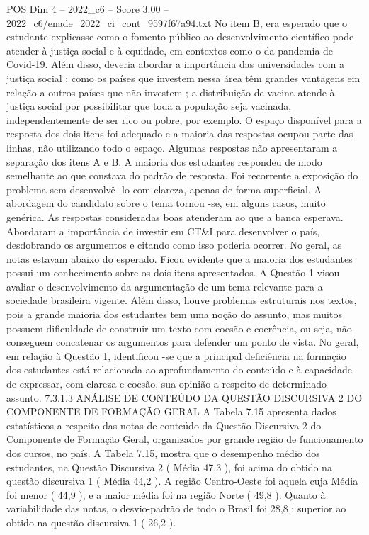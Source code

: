 \begin{textsample}{POS Dim 4 – 2022\_c6 – Score 3.00 – 2022\_c6/enade\_2022\_ci\_cont\_9597f67a94.txt}
No item B, era esperado que o estudante explicasse como o fomento público ao desenvolvimento científico pode atender à justiça social e à equidade, em contextos como o da pandemia de Covid-19.
Além disso, deveria abordar a importância das universidades com a justiça social ; como os países que investem nessa área têm grandes vantagens em relação a outros países que não investem ; a distribuição de vacina atende à justiça social por possibilitar que toda a população seja vacinada, independentemente de ser rico ou pobre, por exemplo.
O espaço disponível para a resposta dos dois itens foi adequado e a maioria das respostas ocupou parte das linhas, não utilizando todo o espaço.
Algumas respostas não apresentaram a separação dos itens A e B.
A maioria dos estudantes respondeu de modo semelhante ao que constava do padrão de resposta.
Foi recorrente a exposição do problema sem desenvolvê -lo com clareza, apenas de forma superficial.
A abordagem do candidato sobre o tema tornou -se, em alguns casos, muito genérica.
As respostas consideradas boas atenderam ao que a banca esperava.
Abordaram a importância de investir em CT\&I para desenvolver o país, desdobrando os argumentos e citando como isso poderia ocorrer.
No geral, as notas estavam abaixo do esperado.
Ficou evidente que a maioria dos estudantes possui um conhecimento sobre os dois itens apresentados.
A Questão 1 visou avaliar o desenvolvimento da argumentação de um tema relevante para a sociedade brasileira vigente.
Além disso, houve problemas estruturais nos textos, pois a grande maioria dos estudantes tem uma noção do assunto, mas muitos possuem dificuldade de construir um texto com coesão e coerência, ou seja, não conseguem concatenar os argumentos para defender um ponto de vista.
No geral, em relação à Questão 1, identificou -se que a principal deficiência na formação dos estudantes está relacionada ao aprofundamento do conteúdo e à capacidade de expressar, com clareza e coesão, sua opinião a respeito de determinado assunto. 7.3.1.3 ANÁLISE DE CONTEÚDO DA QUESTÃO DISCURSIVA 2 DO COMPONENTE DE FORMAÇÃO GERAL A Tabela 7.15 apresenta dados estatísticos a respeito das notas de conteúdo da Questão Discursiva 2 do Componente de Formação Geral, organizados por grande região de funcionamento dos cursos, no país.
A Tabela 7.15, mostra que o desempenho médio dos estudantes, na Questão Discursiva 2 ( Média 47,3 ), foi acima do obtido na questão discursiva 1 ( Média 44,2 ).
A região Centro-Oeste foi aquela cuja Média foi menor ( 44,9 ), e a maior média foi na região Norte ( 49,8 ).
Quanto à variabilidade das notas, o desvio-padrão de todo o Brasil foi 28,8 ; superior ao obtido na questão discursiva 1 ( 26,2 ).

\end{textsample}
